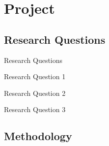 
\section{Project}
\subsection{Research Questions}

\def\rqa{\begin{alertblock}{Research Question 1}
        \rqatext{}
    \end{alertblock}
}

\def\rqb{\begin{alertblock}{Research Question 2}
        \rqbtext{}
    \end{alertblock}
}

\def\rqc{\begin{alertblock}{Research Question 3}
        \rqctext{}
    \end{alertblock}
}

\begin{frame}{Research Questions}
    \rqa{} \vspace*{\fill}
    \rqb{} \vspace*{\fill}
    \rqc{} \vspace*{\fill}
    \vspace{0.2cm}
\end{frame}

\subsection{Methodology}



